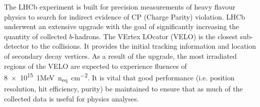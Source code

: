 \documentclass[10pt,twocolumn]{article}
\begin{document}
The LHCb experiment is built for precision measurements of heavy flavour physics to search for indirect evidence of CP (Charge Parity) violation. 
LHCb underwent an extensive upgrade 
with the goal of significantly increasing the quantity of collected $b$-hadrons.
The VErtex LOcator (VELO) is the closest sub-detector to the collisions. It provides the initial tracking information and location of secondary decay vertices. As a result of the upgrade, the most irradiated regions of the VELO are expected to experience fluences of \qty{8e15}{1MeV.n_{eq}.cm^{-2}}. It is vital that good performance (i.e. position resolution, hit efficiency, purity) be maintained to ensure that as much of the collected data is useful for physics analyses.

\end{document}
